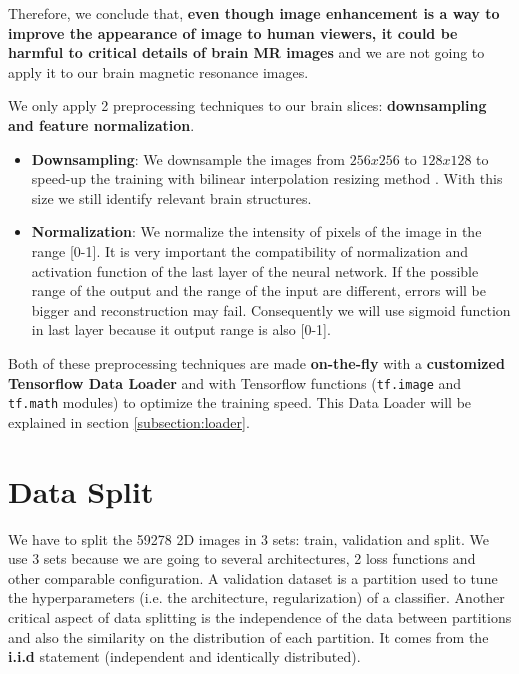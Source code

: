 
Therefore, we conclude that, \textbf{even though image enhancement is a way to improve the appearance of image to human viewers, it could be harmful to critical details of brain MR images} and we are not going to apply it to our brain magnetic resonance images.

We only apply 2 preprocessing techniques to our brain slices: \textbf{downsampling and feature normalization}.
\begin{itemize}
    \item \textbf{Downsampling}: We downsample the images from $256x256$ to $128x128$ to speed-up the training with bilinear interpolation resizing method . With this size we still identify relevant brain structures. 
    \item \textbf{Normalization}: We normalize the intensity of pixels of the image in the range [0-1]. It is very important the compatibility of normalization and activation function of the last layer of the neural network. If the possible range of the output and the range of the input are different, errors will be bigger and reconstruction may fail. Consequently we will use sigmoid function in last layer because it output range is also [0-1].
\end{itemize}

Both of these preprocessing techniques are made \textbf{on-the-fly} with a \textbf{customized Tensorflow Data Loader} and with Tensorflow functions (\texttt{tf.image} and \texttt{tf.math} modules) to optimize the training speed. This Data Loader will be explained in section \ref{subsection:loader}.

\section{Data Split}
\label{subsection:datasplitting}

We have to split the 59278 2D images in 3 sets: train, validation and split. We use 3 sets because we are going to several architectures, 2 loss functions and other comparable configuration. A validation dataset is a partition used to tune the hyperparameters (i.e. the architecture, regularization) of a classifier. Another critical aspect of data splitting is the independence of the data between partitions and also the similarity on the distribution of each partition. It comes from the \textbf{i.i.d} statement (independent and identically distributed). 

